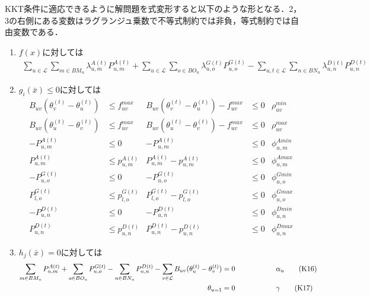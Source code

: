 \documentclass[a4j,10.5pt,fleqn]{jarticle}
\begin{document}
KKT条件に適応できるように解問題を式変形すると以下のような形となる．2，3の右側にある変数はラグランジュ乗数で不等式制約では非負，等式制約では自由変数である．
\begin{enumerate}
\item $f(x)$に対しては
\begin{align}
\sum_{u\in \mathcal{L}}\sum_{m\in BM_u}\lambda^{A(t)}_{u,m}P^{A(t)}_{u,m}+\sum_{u\in \mathcal{L}}\sum_{o\in BO_u}\lambda^{G(t)}_{u,o}P^{G(t)}_{u,o}-\sum_{u,t\in \mathcal{L}}\sum_{n\in BN_u}\lambda^{D(t)}_{u,n}P^{D(t)}_{u,n}\label{K7}\tag{K7}
\end{align}
\item $g_i(\bar{x})\le 0$に対しては
\begin{align}
B_{uv}(\theta_v^{(t)}-\theta_u^{(t)})&\le f_{uv}^{max} &B_{uv}(\theta_v^{(t)}-\theta_u^{(t)})-f_{uv}^{max}&\le 0 &\rho_{uv}^{min}\label{K8}\tag{K8}\\
B_{uv}(\theta_u^{(t)}-\theta_v^{(t)})&\le f_{uv}^{max}&B_{uv}(\theta_u^{(t)}-\theta_v^{(t)})-f_{uv}^{max}&\le 0&\rho_{uv}^{max}\label{K9}\tag{K9}\\
-P_{u,m}^{A(t)}&\le 0&-P_{u,m}^{A(t)}&\le 0&\phi_{u,m}^{Amin}\label{K10}\tag{K10}\\
P_{u,m}^{A(t)}&\le p_{u,m}^{A(t)}&P_{u,m}^{A(t)}-p_{u,m}^{A(t)}&\le 0&\phi_{u,m}^{Amax}\label{K11}\tag{K11}\\
-P_{u,o}^{G(t)}&\le 0&-P_{u,o}^{G(t)}&\le 0&\phi_{u,o}^{Gmin}\label{K12}\tag{K12}\\
P_{l,o}^{G(t)}&\le p_{l,o}^{G(t)}&P_{l,o}^{G(t)}-p_{l,o}^{G(t)}&\le 0&\phi_{u,o}^{Gmax}\label{K13}\tag{K13}\\
-P_{u,n}^{D(t)}&\le 0&-P_{u,n}^{D(t)}&\le 0&\phi_{u,n}^{Dmin}\label{K14}\tag{K14}\\
P_{u,n}^{D(t)}&\le p_{u,n}^{D(t)}&P_{u,n}^{D(t)}-p_{u,n}^{D(t)}&\le 0&\phi_{u,n}^{Dmax}\label{K15}\tag{K15}
\end{align}
\item $h_j(\bar{x})=0$に対しては
\begin{align}
\sum_{m\in BM_u}P^{A(t)}_{u,m}+\sum_{o\in BO_u}P^{G(t)}_{u,o}-\sum_{n\in BN_u}P^{D(t)}_{u,n}-\sum_{v\in \mathcal{L}}B_{uv}(\theta_u^{(t)}-\theta_v^{(t)})=0&\hspace{20mm}\alpha_u\label{K16}\tag{K16}\\
\theta_{u=1}=0&\hspace{20mm}\gamma\label{K17}\tag{K17}
\end{align}
\end{enumerate}
\newpage
\end{document}
